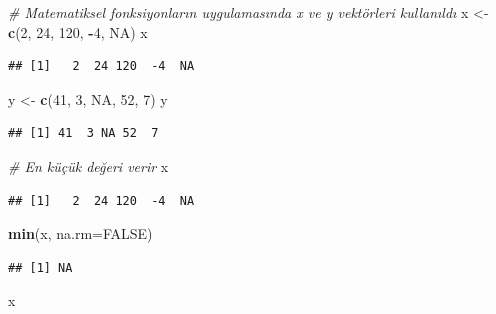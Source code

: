 \documentclass[
]{book}
\newenvironment{Shaded}{\begin{snugshade}}{\end{snugshade}}
\newcommand{\AttributeTok}[1]{\textcolor[rgb]{0.13,0.29,0.53}{#1}}
\newcommand{\CommentTok}[1]{\textcolor[rgb]{0.56,0.35,0.01}{\textit{#1}}}
\newcommand{\ConstantTok}[1]{\textcolor[rgb]{0.56,0.35,0.01}{#1}}
\newcommand{\DecValTok}[1]{\textcolor[rgb]{0.00,0.00,0.81}{#1}}
\newcommand{\FunctionTok}[1]{\textcolor[rgb]{0.13,0.29,0.53}{\textbf{#1}}}
\newcommand{\NormalTok}[1]{#1}
\newcommand{\OtherTok}[1]{\textcolor[rgb]{0.56,0.35,0.01}{#1}}
\newcommand{\SpecialCharTok}[1]{\textcolor[rgb]{0.81,0.36,0.00}{\textbf{#1}}}
\begin{document}
\begin{Shaded}
\begin{Highlighting}[]
\CommentTok{\# Matematiksel fonksiyonların uygulamasında x ve y vektörleri kullanıldı}
\NormalTok{x }\OtherTok{\textless{}{-}} \FunctionTok{c}\NormalTok{(}\DecValTok{2}\NormalTok{, }\DecValTok{24}\NormalTok{, }\DecValTok{120}\NormalTok{, }\SpecialCharTok{{-}}\DecValTok{4}\NormalTok{, }\ConstantTok{NA}\NormalTok{)}
\NormalTok{x}
\end{Highlighting}
\end{Shaded}

\begin{verbatim}
## [1]   2  24 120  -4  NA
\end{verbatim}

\begin{Shaded}
\begin{Highlighting}[]
\NormalTok{y }\OtherTok{\textless{}{-}} \FunctionTok{c}\NormalTok{(}\DecValTok{41}\NormalTok{, }\DecValTok{3}\NormalTok{, }\ConstantTok{NA}\NormalTok{, }\DecValTok{52}\NormalTok{, }\DecValTok{7}\NormalTok{)}
\NormalTok{y}
\end{Highlighting}
\end{Shaded}

\begin{verbatim}
## [1] 41  3 NA 52  7
\end{verbatim}

\begin{Shaded}
\begin{Highlighting}[]
\CommentTok{\# En küçük değeri verir}
\NormalTok{x}
\end{Highlighting}
\end{Shaded}

\begin{verbatim}
## [1]   2  24 120  -4  NA
\end{verbatim}

\begin{Shaded}
\begin{Highlighting}[]
\FunctionTok{min}\NormalTok{(x, }\AttributeTok{na.rm=}\ConstantTok{FALSE}\NormalTok{)}
\end{Highlighting}
\end{Shaded}

\begin{verbatim}
## [1] NA
\end{verbatim}

\begin{Shaded}
\begin{Highlighting}[]
\NormalTok{x}
\end{Highlighting}
\end{Shaded}
\end{document}
